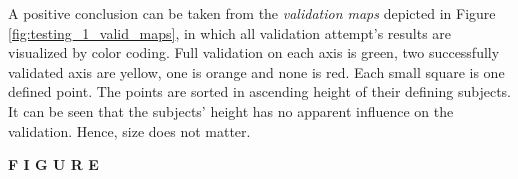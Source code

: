 A positive conclusion can be taken from the \textit{validation maps} depicted in Figure \ref{fig:testing_1_valid_maps}, in which all validation attempt's results are visualized by color coding. Full validation on each axis is green, two successfully validated axis are yellow, one is orange and none is red. Each small square is one defined point. The points are sorted in ascending height of their defining subjects. It can be seen that the subjects' height has no apparent influence on the validation. Hence, size does not matter.

\textbf{F I G U R E}

